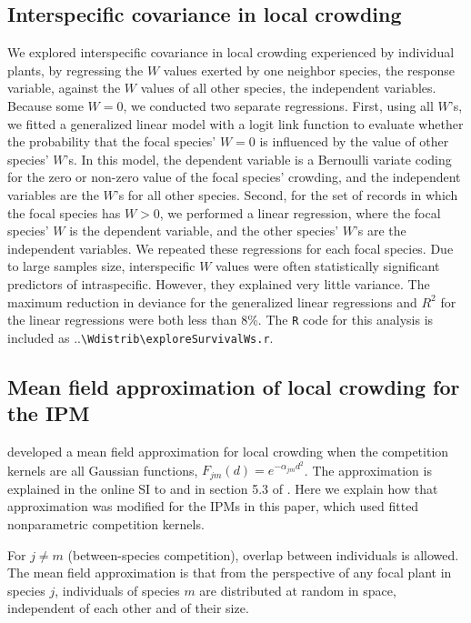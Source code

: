 \documentclass[11pt]{article}
\begin{document}
\subsection*{Interspecific covariance in local crowding} 
We explored interspecific covariance in local crowding experienced by individual plants, by regressing the $W$ values exerted by one neighbor species, the response variable, against the $W$ values of all other species, the independent variables. Because some $W=0$, we conducted two separate regressions. First, using all $W$'s, we fitted a generalized linear model with a logit link function to evaluate whether the probability that the focal species' $W=0$ is influenced by the value of other species' $W$'s. In this model, the dependent variable is a Bernoulli variate coding for the zero or non-zero value of the focal species' crowding, and the independent variables are the $W$'s for all other species. Second, for the set of records in which the focal species has $W>0$, we performed a linear regression, where the focal species' $W$ is the dependent variable, and the other species' $W$'s are the independent variables. We repeated these regressions for each focal species. Due to large samples size, interspecific $W$ values were often statistically significant predictors of intraspecific. However, they explained very little variance. The maximum reduction in deviance for the generalized linear regressions and $R^2$ for the linear regressions were both less than 8\%. The \texttt{R} code for this analysis is included as ..\texttt{\textbackslash Wdistrib\textbackslash exploreSurvivalWs.r}.

\subsection*{Mean field approximation of local crowding for the IPM} 
\citet{adler_coexistence_2010} developed a mean field approximation for local crowding when the
competition kernels are all Gaussian functions, $F_{jm}(d) = e^{-\alpha_{jm} d^2}$. The approximation is explained in 
the online SI to \citet{adler_coexistence_2010} and in section 5.3 of \citet{Ellner2016}. 
Here we explain how that approximation was modified for the IPMs in this paper, which
used fitted nonparametric competition kernels. 

For $j \ne m$ (between-species competition), overlap between individuals is allowed. The mean field approximation is 
that from the perspective of any focal plant in species $j$, individuals of species $m$ are distributed at random in space, 
independent of each other and of their size.
\end{document}
